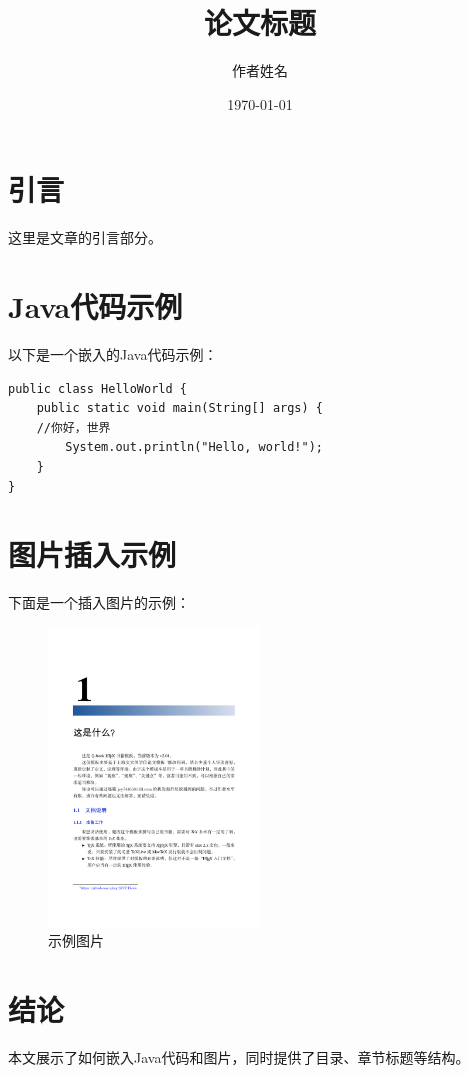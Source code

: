 \documentclass[10pt]{article}
\title{论文标题}
\author{作者姓名}
\date{\today}
\begin{document}
\maketitle

\tableofcontents
\newpage

\section{引言}
这里是文章的引言部分。

\section{Java代码示例}
以下是一个嵌入的Java代码示例：

\begin{lstlisting}[style=java, caption={HelloWorld.java}]
public class HelloWorld {
    public static void main(String[] args) {
	//你好，世界
        System.out.println("Hello, world!");
    }
}
\end{lstlisting}

\section{图片插入示例}
下面是一个插入图片的示例：

\begin{figure}[H]
    \centering
    \includegraphics[width=0.5\textwidth]{9.png} %
    \caption{示例图片}
    \label{fig:example}
\end{figure}

\section{结论}
本文展示了如何嵌入Java代码和图片，同时提供了目录、章节标题等结构。
\end{document}
